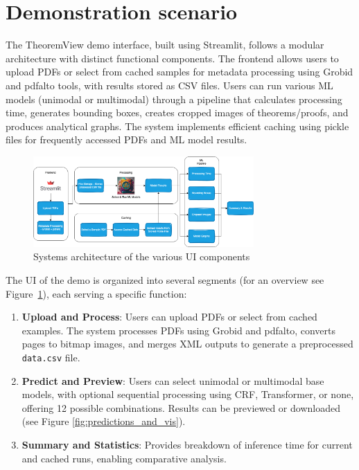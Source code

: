 \documentclass[runningheads]{llncs}
\begin{document}
\section{Demonstration scenario}

The TheoremView demo interface, built using Streamlit, follows a modular architecture with distinct functional components. The frontend allows users to upload PDFs or select from cached samples for metadata processing using Grobid and pdfalto tools, with results stored as CSV files. Users can run various ML models (unimodal or multimodal) through a pipeline that calculates processing time, generates bounding boxes, creates cropped images of theorems/proofs, and produces analytical graphs. The system implements efficient caching using pickle files for frequently accessed PDFs and ML model results.

\begin{figure}[h]
    \centering
    \includegraphics[width=0.75\textwidth]{images/sys-demo-arch.png}
    \caption{Systems architecture of the various UI components
    }
    \label{fig:system-arch}
\end{figure}

The UI of the demo is organized into several segments (for an overview see Figure~\ref{fig:system-arch}), each serving a specific function:

\begin{enumerate}
    \item \textbf{Upload and Process}: Users can upload PDFs or select from cached examples. The system processes PDFs using Grobid and pdfalto, converts pages to bitmap images, and merges XML outputs to generate a preprocessed \texttt{data.csv} file.

    \item \textbf{Predict and Preview}: Users can select unimodal or multimodal base models, with optional sequential processing using CRF, Transformer, or none, offering 12 possible combinations. Results can be previewed or downloaded (see Figure \ref{fig:predictions_and_vis}).

    \item \textbf{Summary and Statistics}: Provides breakdown of inference time for current and cached runs, enabling comparative analysis.
\end{enumerate}
\end{document}
